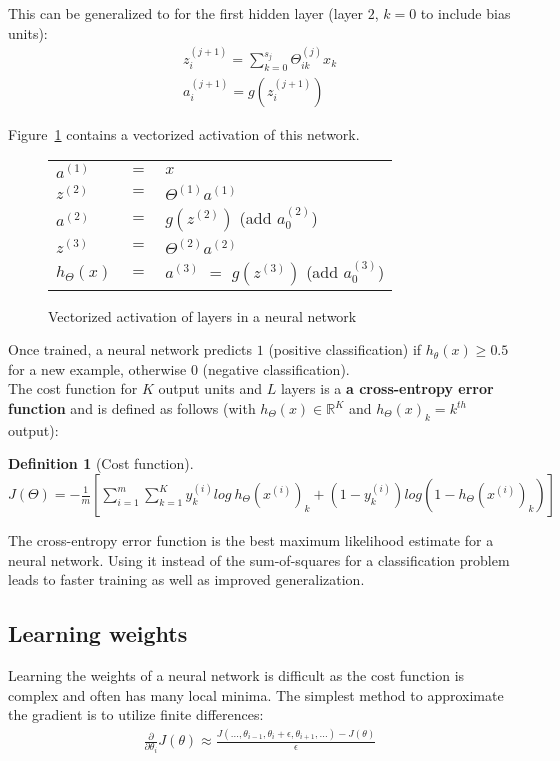 \documentclass{report}
\newtheorem{definition}{Definition}[section]
\begin{document}
This can be generalized to for the first hidden layer (layer $2$, $k=0$ to include bias units):
\begin{align*}
z_i^{(j+1)} = \sum_{k=0}^{s_{j}} \Theta_{ik}^{(j)}x_k \\
a_i^{(j+1)} = g(z_i^{(j+1)})
\end{align*}

Figure~\ref{ref:neuralnetworkmappingvectorized} contains a vectorized activation of this network. \\

\begin{figure}[h!]
\centering
\begin{tabular}{lcl}
$a^{(1)}$ & $=$ & $x$ \\
$z^{(2)}$ & $=$ & $\Theta^{(1)}a^{(1)}$ \\
$a^{(2)}$ & $=$ & $g(z^{(2)})$ (add $a_0^{(2)}$) \\
$z^{(3)}$ & $=$ & $\Theta^{(2)}a^{(2)}$ \\
$h_{\Theta}(x)$ & $=$ & $a^{(3)}$ $=$ $g(z^{(3)})$ (add $a_0^{(3)}$) \\
\end{tabular}
\caption{Vectorized activation of layers in a neural network}
\label{ref:neuralnetworkmappingvectorized}
\end{figure}

Once trained, a neural network predicts $1$ (positive classification) if $h_\theta(x) \ge 0.5$ for a new example, otherwise $0$ (negative classification). \\

The cost function for $K$ output units and $L$ layers is a {\bf a cross-entropy error function} and is defined as follows (with $h_\Theta(x) \in \mathbb{R}^K$ and $h_\Theta(x)_k = k^{th}$ output):

\begin{definition}[Cost function] ~\\
$J(\Theta) = -\frac{1}{m}[\sum_{i=1}^m \sum_{k=1}^K y_k^{(i)}log\:h_{\Theta}(x^{(i)})_k+(1-y_k^{(i)})log(1-h_{\Theta}(x^{(i)})_k)]$
\end{definition}


The cross-entropy error function is the best maximum likelihood estimate for a neural network.
Using it instead of the sum-of-squares for a classification problem leads to faster training as well as improved generalization.


\subsection{Learning weights}
\label{chapter:learningweights}
Learning the weights of a neural network is difficult as the cost function is complex and often has many local minima.
The simplest method to approximate the gradient is to utilize finite differences:
\begin{align*}
\frac{\partial}{\partial\theta_i}J(\theta)\approx\frac{J(...,\theta_{i-1},\theta_{i}+\epsilon,\theta_{i+1},...)-J(\theta)}{\epsilon}
\end{align*}
\end{document}
